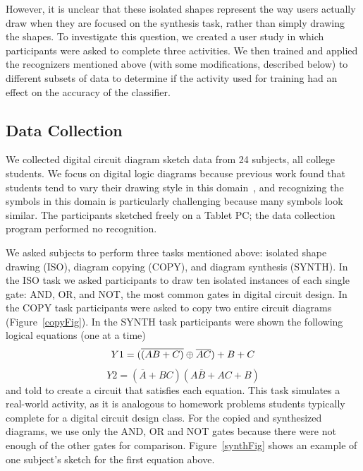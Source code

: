 \documentclass{egpubl}
\begin{document}
However, it is unclear that these isolated shapes represent the way users actually draw when they are focused on the synthesis task, rather than simply drawing the shapes. To investigate this question, we created a user study
in which participants were asked to complete three activities.  We then trained and applied the recognizers mentioned above (with some modifications, described below) to different subsets of data to determine if 
the activity used for training had an effect on the accuracy of the classifier. 



\subsection{Data Collection}
We collected digital circuit diagram sketch data from 24 subjects, all college students.  We focus on digital logic diagrams because previous work found that students tend to vary their drawing style in this domain~\cite{Alvarado2007Properties}, and recognizing the symbols in this domain is particularly challenging because many symbols look similar. The participants sketched freely on a Tablet PC; the data collection program performed no recognition.

We asked subjects to perform three tasks mentioned above: isolated shape
drawing (ISO), diagram copying (COPY), and diagram synthesis (SYNTH).  In the
ISO task we asked participants to draw ten isolated instances of each single gate: AND, OR, and NOT, the most common gates in digital circuit design.  In the
COPY task participants were asked to copy two entire circuit diagrams (Figure~\ref{copyFig}).  In the
SYNTH task participants were shown the following logical equations (one at a time)
\[
Y1 = (\overline{(AB+C)}\oplus\overline{AC})+B+C \\
\]
\[
Y2 = (\overline{A}+BC)(A\overline{B}+AC+B)
\]
and
told to create a circuit that satisfies each equation.  This task simulates a
real-world activity, as it is analogous to homework problems students typically
complete for a digital circuit design class.  For the copied and synthesized diagrams, 
we use only the AND, OR and NOT gates because there were not enough of the other gates 
for comparison.  Figure~\ref{synthFig} shows an example of one subject's sketch for 
the first equation above.
\end{document}
